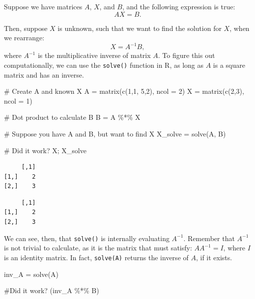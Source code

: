 \documentclass[
  letterpaper,
  DIV=11,
  numbers=noendperiod]{scrreprt}
\newenvironment{Shaded}{\begin{snugshade}}{\end{snugshade}}
\newcommand{\AttributeTok}[1]{\textcolor[rgb]{0.40,0.45,0.13}{#1}}
\newcommand{\CommentTok}[1]{\textcolor[rgb]{0.37,0.37,0.37}{#1}}
\newcommand{\DecValTok}[1]{\textcolor[rgb]{0.68,0.00,0.00}{#1}}
\newcommand{\FunctionTok}[1]{\textcolor[rgb]{0.28,0.35,0.67}{#1}}
\newcommand{\NormalTok}[1]{\textcolor[rgb]{0.00,0.23,0.31}{#1}}
\newcommand{\OtherTok}[1]{\textcolor[rgb]{0.00,0.23,0.31}{#1}}
\newcommand{\SpecialCharTok}[1]{\textcolor[rgb]{0.37,0.37,0.37}{#1}}
\begin{document}
Suppose we have matrices \(A\), \(X\), and \(B\), and the following
expression is true: \[AX=B.\]

Then, suppose \(X\) is unknown, such that we want to find the solution
for \(X\), when we rearrange: \[X = A^{-1} B,\] where \(A^{-1}\) is the
multiplicative inverse of matrix \(A\). To figure this out
computationally, we can use the \texttt{solve()} function in R, as long
as \(A\) is a square matrix and has an inverse.

\begin{Shaded}
\begin{Highlighting}[]
\CommentTok{\# Create A and known X}
\NormalTok{A }\OtherTok{=} \FunctionTok{matrix}\NormalTok{(}\FunctionTok{c}\NormalTok{(}\DecValTok{1}\NormalTok{,}\DecValTok{1}\NormalTok{,}
             \DecValTok{5}\NormalTok{,}\DecValTok{2}\NormalTok{), }\AttributeTok{ncol =} \DecValTok{2}\NormalTok{)}
\NormalTok{X }\OtherTok{=} \FunctionTok{matrix}\NormalTok{(}\FunctionTok{c}\NormalTok{(}\DecValTok{2}\NormalTok{,}\DecValTok{3}\NormalTok{), }\AttributeTok{ncol =} \DecValTok{1}\NormalTok{)}

\CommentTok{\# Dot product to calculate B}
\NormalTok{B }\OtherTok{=}\NormalTok{ A }\SpecialCharTok{\%*\%}\NormalTok{ X}

\CommentTok{\# Suppose you have A and B, but want to find X}
\NormalTok{X\_solve }\OtherTok{=} \FunctionTok{solve}\NormalTok{(A, B)}

\CommentTok{\# Did it work?}
\NormalTok{X; X\_solve}
\end{Highlighting}
\end{Shaded}

\begin{verbatim}
     [,1]
[1,]    2
[2,]    3
\end{verbatim}

\begin{verbatim}
     [,1]
[1,]    2
[2,]    3
\end{verbatim}

We can see, then, that \texttt{solve()} is internally evaluating
\(A^{-1}\). Remember that \(A^{-1}\) is not trivial to calculate, as it
is the matrix that must satisfy: \(AA^{-1} = I\), where \(I\) is an
identity matrix. In fact, \texttt{solve(A)} returns the inverse of
\(A\), if it exists.

\begin{Shaded}
\begin{Highlighting}[]
\NormalTok{inv\_A }\OtherTok{=} \FunctionTok{solve}\NormalTok{(A)}

\CommentTok{\#Did it work?}
\NormalTok{(inv\_A }\SpecialCharTok{\%*\%}\NormalTok{ B)}
\end{Highlighting}
\end{Shaded}
\end{document}
